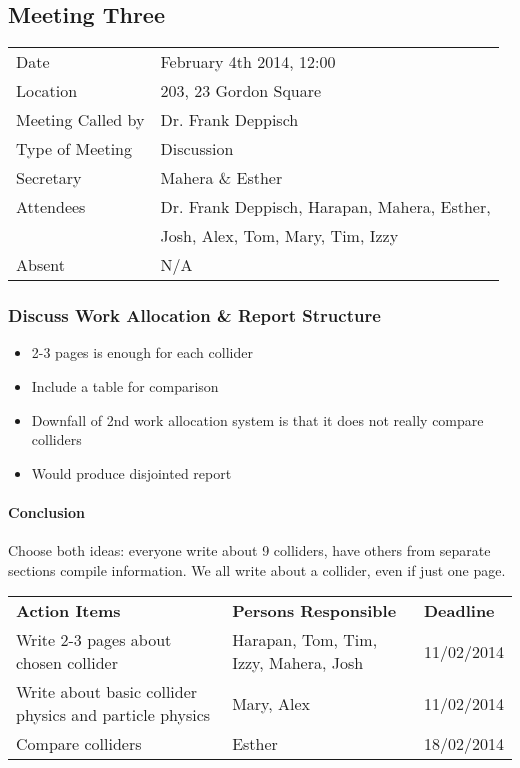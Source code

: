 \subsection{Meeting Three}

\begin{tabular}{l l}
  Date & February 4th 2014, 12:00 \\
  Location & 203, 23 Gordon Square \\
  Meeting Called by & Dr. Frank Deppisch \\
  Type of Meeting & Discussion \\
  Secretary & Mahera \& Esther \\
  Attendees & Dr. Frank Deppisch, Harapan, Mahera, Esther, \\
  & Josh, Alex, Tom, Mary, Tim, Izzy \\
  Absent & N/A \\  
\end{tabular}

\subsubsection{Discuss Work Allocation \& Report Structure}

\begin{itemize}
\item 2-3 pages is enough for each collider
\item Include a table for comparison
\item Downfall of 2nd work allocation system is that it does not really compare colliders
\item Would produce disjointed report 
\end{itemize}

\paragraph{Conclusion}
 Choose both ideas: everyone write about 9 colliders, have others from separate sections compile information. We all write about a collider, even if just one page.
 

\begin{tabularx}{\textwidth}{X p{4.5cm} p{1.2cm}}
  \textbf{Action Items} & \textbf{Persons Responsible} & \textbf{Deadline} \\
Write 2-3 pages about chosen collider & Harapan, Tom, Tim, Izzy, Mahera, Josh
& 11/02/2014 \\
Write about basic collider physics and particle physics
& Mary, Alex
 & 11/02/2014 \\
 Compare colliders &
Esther & 
18/02/2014 \\
\end{tabularx}



